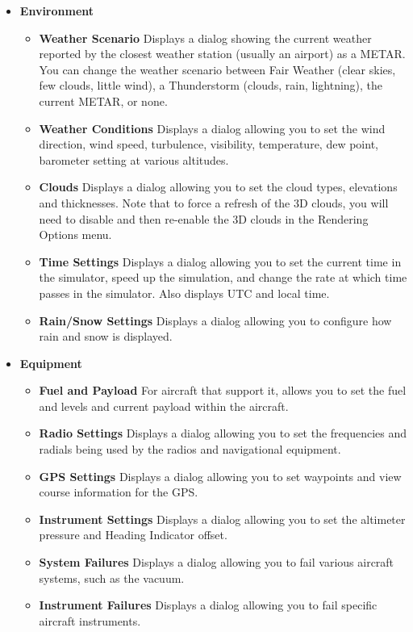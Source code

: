 \begin{itemize}
\item \textbf{Environment}
 \begin{itemize}
  \item \textbf{Weather Scenario} Displays a dialog showing the current weather
reported by the closest
  weather station (usually an airport) as a METAR. You can change the weather
scenario between
  Fair Weather (clear skies, few clouds, little wind), a Thunderstorm (clouds,
rain, lightning), the current METAR, or none.
  \item \textbf{Weather Conditions}  Displays a dialog allowing you to set the
wind direction, wind speed,
  turbulence, visibility, temperature, dew point, barometer setting at various
altitudes.
  \item \textbf{Clouds}  Displays a dialog allowing you to set the cloud types,
elevations and thicknesses. Note that to force a refresh of the 3D clouds, you
will need to disable and then re-enable the 3D clouds in the Rendering Options menu.
  \item \textbf{Time Settings}  Displays a dialog allowing you to set the current
time in the simulator, speed up the simulation, and change the rate at which
time passes in the simulator. Also displays UTC and local time.
  \item \textbf{Rain/Snow Settings}  Displays a dialog allowing you to
configure how rain and snow is displayed.
 \end{itemize}

\item \textbf{Equipment}
 \begin{itemize}
  \item \textbf{Fuel and Payload}  For aircraft that support it, allows you to
set the fuel and levels and current payload within the aircraft.
  \item \textbf{Radio Settings}  Displays a dialog allowing you to set the
frequencies and radials being used by the radios and navigational equipment.
  \item \textbf{GPS Settings}  Displays a dialog allowing you to set waypoints
and view course information for the GPS.
  \item \textbf{Instrument Settings}  Displays a dialog allowing you to set the
altimeter pressure and Heading Indicator offset.
  \item \textbf{System Failures} Displays a dialog allowing you to fail various
aircraft systems, such as the vacuum.
  \item \textbf{Instrument Failures}  Displays a dialog allowing you to fail
specific aircraft instruments.
 \end{itemize}


\end{itemize}
